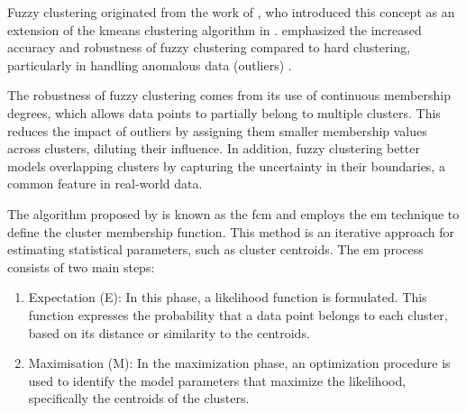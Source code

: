 \noindent Fuzzy clustering originated from the work of \citeauthor{FuzzyClustering_developDoc}, who introduced this concept as an extension of the \gls{kmeans} clustering algorithm in \citeyear{FuzzyClustering_developDoc}. \citeauthor{FuzzyClustering_developDoc} emphasized the increased accuracy and robustness of fuzzy clustering compared to hard clustering, particularly in handling anomalous data (outliers) \citep{FuzzyClustering_developDoc}.

\noindent The robustness of fuzzy clustering comes from its use of continuous membership degrees, which allows data points to partially belong to multiple clusters. This reduces the impact of outliers by assigning them smaller membership values across clusters, diluting their influence. In addition, fuzzy clustering better models overlapping clusters by capturing the uncertainty in their boundaries, a common feature in real-world data.

\noindent The algorithm proposed by \citep{FuzzyClustering_developDoc} is known as the \gls{fcm} and employs the \gls{em} technique to define the cluster membership function. This method is an iterative approach for estimating statistical parameters, such as cluster centroids. The \gls{em} process consists of two main steps:
\begin{enumerate}
    \item Expectation (E): In this phase, a likelihood function is formulated. This function expresses the probability that a data point belongs to each cluster, based on its distance or similarity to the centroids.
    \item Maximisation (M): In the maximization phase, an optimization procedure is used to identify the model parameters that maximize the likelihood, specifically the centroids of the clusters.
\end{enumerate}

